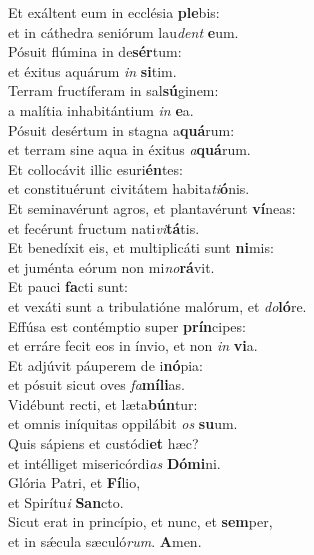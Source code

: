 \evenverse Et exáltent eum in ecclésia \textbf{ple}bis:~\*\\
\evenverse et in cáthedra seniórum lau\textit{dent} \textbf{e}um.\\
\oddverse Pósuit flúmina in de\textbf{sér}tum:~\*\\
\oddverse et éxitus aquárum \textit{in} \textbf{si}tim.\\
\evenverse Terram fructíferam in sal\textbf{sú}ginem:~\*\\
\evenverse a malítia inhabitántium \textit{in} \textbf{e}a.\\
\oddverse Pósuit desértum in stagna a\textbf{quá}rum:~\*\\
\oddverse et terram sine aqua in éxitus \textit{a}\textbf{quá}rum.\\
\evenverse Et collocávit illic esuri\textbf{én}tes:~\*\\
\evenverse et constituérunt civitátem habita\textit{ti}\textbf{ó}nis.\\
\oddverse Et seminavérunt agros, et plantavérunt \textbf{ví}neas:~\*\\
\oddverse et fecérunt fructum nati\textit{vi}\textbf{tá}tis.\\
\evenverse Et benedíxit eis, et multiplicáti sunt \textbf{ni}mis:~\*\\
\evenverse et juménta eórum non mi\textit{no}\textbf{rá}vit.\\
\oddverse Et pauci \textbf{fa}cti sunt:~\*\\
\oddverse et vexáti sunt a tribulatióne malórum, et \textit{do}\textbf{ló}re.\\
\evenverse Effúsa est contémptio super \textbf{prín}cipes:~\*\\
\evenverse et erráre fecit eos in ínvio, et non \textit{in} \textbf{vi}a.\\
\oddverse Et adjúvit páuperem de i\textbf{nó}pia:~\*\\
\oddverse et pósuit sicut oves \textit{fa}\textbf{mí}\textbf{li}as.\\
\evenverse Vidébunt recti, et læta\textbf{bún}tur:~\*\\
\evenverse et omnis iníquitas oppilábit \textit{os} \textbf{su}um.\\
\oddverse Quis sápiens et custódi\textbf{et} hæc?~\*\\
\oddverse et intélliget misericórdi\textit{as} \textbf{Dó}\textbf{mi}ni.\\
\evenverse Glória Patri, et \textbf{Fí}lio,~\*\\
\evenverse et Spirítu\textit{i} \textbf{San}cto.\\
\oddverse Sicut erat in princípio, et nunc, et \textbf{sem}per,~\*\\
\oddverse et in sǽcula sæculó\textit{rum}. \textbf{A}men.\\
